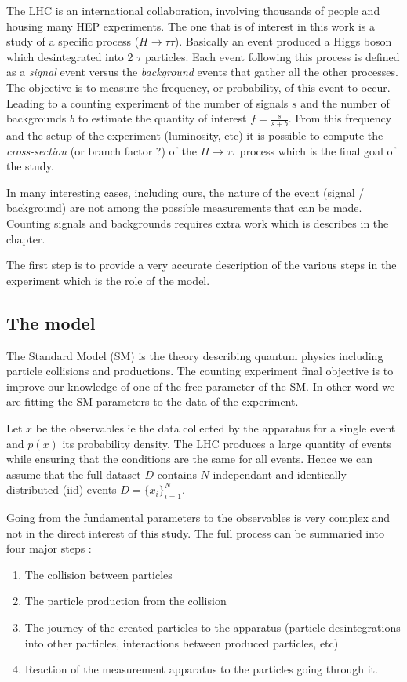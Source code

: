 The LHC is an international collaboration, involving thousands of people and housing many HEP experiments.
The one that is of interest in this work is a study of a specific process ($H \to \tau \tau$).
Basically an event produced a Higgs boson which desintegrated into 2 $\tau$ particles.
Each event following this process is defined as a \emph{signal} event versus the \emph{background} events that gather all the other processes.
The objective is to measure the frequency, or probability, of this event to occur.
Leading to a counting experiment of the number of signals $s$ and the number of backgrounds $b$ to estimate the quantity of interest $f = \frac{s}{s + b}$.
From this frequency and the setup of the experiment (luminosity, etc) it is possible to compute the \emph{cross-section} (or branch factor ?) of the $H \to \tau \tau$ process which is the final goal of the study.

In many interesting cases, including ours, the nature of the event (signal / background) are not among the possible measurements that can be made.
Counting signals and backgrounds requires extra work which is describes in the chapter.

The first step is to provide a very accurate description of the various steps in the experiment which is the role of the model.






\subsection{The model} %
\label{sub:the_model}

The Standard Model \needcite (SM) is the theory describing quantum physics including particle collisions and productions.
The counting experiment final objective is to improve our knowledge of one of the free parameter of the SM.
In other word we are fitting the SM parameters to the data of the experiment.

Let $x$ be the observables ie the data collected by the apparatus for a single event and $p(x)$ its probability density.
The LHC produces a large quantity of events while ensuring that the conditions are the same for all events.
Hence we can assume that the full dataset $D$ contains $N$ independant and identically distributed (iid) events $D = \{x_i\}_{i=1}^N$.

Going from the fundamental parameters to the observables is very complex and not in the direct interest of this study.
The full process can be summaried into four major steps :
\begin{enumerate}
	\item The collision between particles
	\item The particle production from the collision
	\item The journey of the created particles to the apparatus (particle desintegrations into other particles, interactions between produced particles, etc)
	\item Reaction of the measurement apparatus to the particles going through it.
\end{enumerate}

